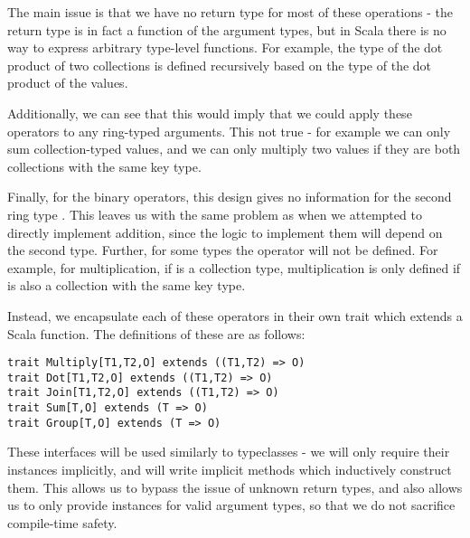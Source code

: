 The main issue is that we have no return type for most of these operations - the return type is in fact a function of the argument types, but in Scala there is no way to express arbitrary type-level functions. For example, the  type of the dot product of two collections is defined recursively based on the type of the dot product of the values.

Additionally, we can see that this would imply that we could apply these operators to any ring-typed arguments. This not true - for example we can only sum collection-typed values, and we can only multiply two values if they are both collections with the same key type.

Finally, for the binary operators, this design gives no information for the second ring type . This leaves us with the same problem as when we attempted to directly implement addition, since the logic to implement them will depend on the second type. Further, for some types the operator will not be defined. For example, for multiplication, if  is a collection type, multiplication is only defined if  is also a collection with the same key type.

Instead, we encapsulate each of these operators in their own trait which extends a Scala function. The definitions of these are as follows:
\vs\begin{lstlisting}
trait Multiply[T1,T2,O] extends ((T1,T2) => O)
trait Dot[T1,T2,O] extends ((T1,T2) => O)
trait Join[T1,T2,O] extends ((T1,T2) => O)
trait Sum[T,O] extends (T => O)
trait Group[T,O] extends (T => O)
\end{lstlisting}\vs
These interfaces will be used similarly to typeclasses - we will only require their instances implicitly, and will write implicit methods which inductively construct them. This allows us to bypass the issue of unknown return types, and also allows us to only provide instances for valid argument types, so that we do not sacrifice compile-time safety.

